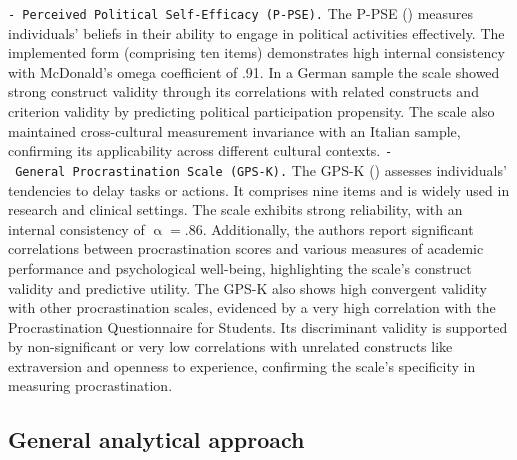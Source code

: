 \documentclass[
  man,floatsintext]{apa7}
\begin{document}
\texttt{-\ Perceived\ Political\ Self-Efficacy\ (P-PSE).} The P-PSE () measures individuals' beliefs in their ability to engage in political activities effectively. The implemented form (comprising ten items) demonstrates high internal consistency with McDonald's omega coefficient of .91. In a German sample the scale showed strong construct validity through its correlations with related constructs and criterion validity by predicting political participation propensity. The scale also maintained cross-cultural measurement invariance with an Italian sample, confirming its applicability across different cultural contexts.
\texttt{-\ General\ Procrastination\ Scale\ (GPS-K).} The GPS-K () assesses individuals' tendencies to delay tasks or actions. It comprises nine items and is widely used in research and clinical settings. The scale exhibits strong reliability, with an internal consistency of \(\upalpha = .86\). Additionally, the authors report significant correlations between procrastination scores and various measures of academic performance and psychological well-being, highlighting the scale's construct validity and predictive utility. The GPS-K also shows high convergent validity with other procrastination scales, evidenced by a very high correlation with the Procrastination Questionnaire for Students. Its discriminant validity is supported by non-significant or very low correlations with unrelated constructs like extraversion and openness to experience, confirming the scale's specificity in measuring procrastination.

\subsection{General analytical approach}\label{general-analytical-approach}
\end{document}
